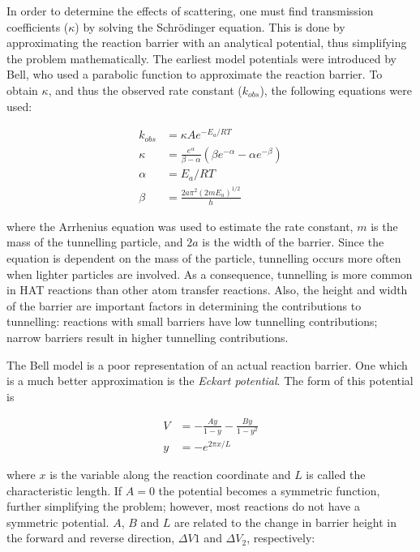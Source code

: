 In order to determine the effects of scattering, one must find transmission
coefficients ($\kappa$) by solving the Schr{\"o}dinger equation. This is done by
approximating the reaction barrier with an analytical potential, thus
simplifying the problem mathematically. The earliest model potentials were
introduced by Bell, who used a parabolic function to approximate the reaction
barrier.\cite{Bell1980} To obtain $\kappa$, and thus the observed rate constant
($k_{obs}$), the following equations were used:

\begin{align}
  k_{obs} &= \kappa A e^{-E_a/RT}  \\
\kappa &= \frac{e^\alpha}{\beta-\alpha} \left(\beta e^{-\alpha} - \alpha
  e^{-\beta} \right) \\
  \alpha &= E_a/RT \\
  \beta &= \frac{2a\pi^2(2mE_a)^{1/2}}{h}
\end{align}

\noindent where the Arrhenius equation was used to estimate the rate constant,
$m$ is the mass of the tunnelling particle, and $2a$ is the width of the
barrier. Since the equation is dependent on the mass of the particle, tunnelling
occurs more often when lighter particles are involved. As a consequence,
tunnelling is more common in HAT reactions than other atom transfer
reactions. Also, the height and width of the barrier are important factors in
determining the contributions to tunnelling: reactions with small barriers have
low tunnelling contributions; narrow barriers result in higher tunnelling
contributions.

The Bell model is a poor representation of an actual reaction barrier. One which
is a much better approximation is the \emph{Eckart potential}.\cite{Johnston1962}
The form of this potential is

\begin{align}
  V &= -\frac{Ay}{1-y} - \frac{By}{1-y^2} \\
  y &= -e^{2\pi x/L}
\end{align}

\noindent where $x$ is the variable along the reaction coordinate and $L$ is
called the characteristic length. If $A=0$ the potential becomes a symmetric
function, further simplifying the problem; however, most reactions do not have a
symmetric potential. $A$, $B$ and $L$ are related to the change in barrier
height in the forward and reverse direction, $\Delta V1$ and $\Delta V_2$,
respectively:

